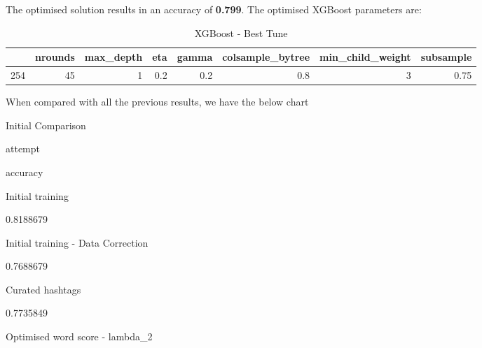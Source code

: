 \documentclass[11pt,]{article}
\newenvironment{Shaded}{\begin{snugshade}}{\end{snugshade}}
\newcommand{\DataTypeTok}[1]{\textcolor[rgb]{0.13,0.29,0.53}{#1}}
\newcommand{\DecValTok}[1]{\textcolor[rgb]{0.00,0.00,0.81}{#1}}
\newcommand{\KeywordTok}[1]{\textcolor[rgb]{0.13,0.29,0.53}{\textbf{#1}}}
\newcommand{\NormalTok}[1]{#1}
\newcommand{\OperatorTok}[1]{\textcolor[rgb]{0.81,0.36,0.00}{\textbf{#1}}}
\newcommand{\StringTok}[1]{\textcolor[rgb]{0.31,0.60,0.02}{#1}}
\begin{document}
\begin{Shaded}
\end{Shaded}

The optimised solution results in an accuracy of \textbf{0.799}. The
optimised XGBoost parameters are:

\begin{table}[H]

\caption{\label{tab:xgbTree_best_tune2}XGBoost - Best Tune}
\centering
\begin{tabular}[t]{lrrrrrrr}
\toprule
  & nrounds & max\_depth & eta & gamma & colsample\_bytree & min\_child\_weight & subsample\\
\midrule
\rowcolor{gray!6}  254 & 45 & 1 & 0.2 & 0.2 & 0.8 & 3 & 0.75\\
\bottomrule
\end{tabular}
\end{table}

When compared with all the previous results, we have the below chart

Initial Comparison

attempt

accuracy

Initial training

0.8188679

Initial training - Data Correction

0.7688679

Curated hashtags

0.7735849

Optimised word score - lambda\_2
\end{document}
